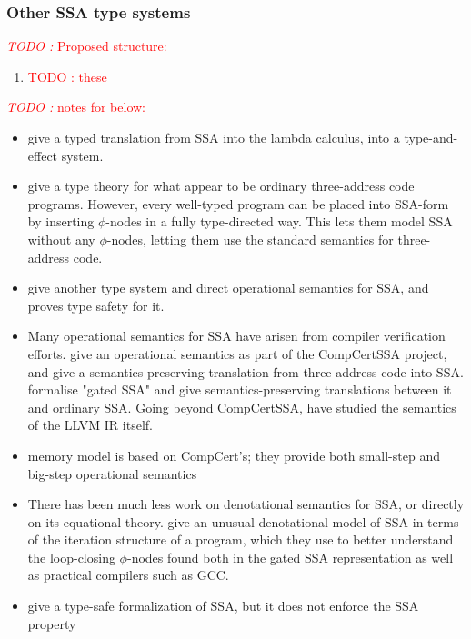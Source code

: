 \documentclass[acmsmall,screen,review]{acmart}
\newcounter{todos}
\newcommand{\TODO}[1]{{
  \stepcounter{todos}
  \begin{center}\large{\textcolor{red}{\emph{TODO \arabic{todos}:} #1}}\end{center}
}}
\newcommand{\todo}[1]{\stepcounter{todos} \textcolor{red}{TODO \arabic{todos}: #1}}
\begin{document}
\subsubsection{Other SSA type systems}

\TODO{Proposed structure:}

\begin{enumerate}
  \item \todo{these}
\end{enumerate}

\TODO{notes for below:}

\begin{itemize}
  \item \citet{typed-effect-ssa-rigon-torrens-vasconcellos-20} give a typed translation from SSA
  into the lambda calculus, into a type-and-effect system.
  \item \citet{ssa-types-matsuno-ohori-06} give a type theory for what appear to be ordinary
  three-address code programs. However, every well-typed program can be placed into SSA-form by
  inserting $\phi$-nodes in a fully type-directed way. This lets them model SSA without any
  $\phi$-nodes, letting them use the standard semantics for three-address code.
  \item \citet{hua-explicit-ssa-2010} give another type system and direct operational
  semantics for SSA, and proves type safety for it. 
  \item Many operational semantics for SSA have arisen from compiler verification efforts.
  \citet{barthe-compcert-ssa-2014} give an operational semantics as part of the CompCertSSA project,
  and give a semantics-preserving translation from three-address code into SSA.
  \citet{herklotz-gsa-2023} formalise "gated SSA" and give semantics-preserving translations between
  it and ordinary SSA. Going beyond CompCertSSA, \citet{vellvm-12} have studied the semantics of the
  LLVM IR itself.  
  \item \citet{vellvm-12} memory model is based on CompCert's; they provide both small-step and
  big-step operational semantics
  \item There has been much less work on denotational semantics for SSA, or directly on its
  equational theory. \citet{pop-ssa-inout-2009} give an unusual denotational model of SSA in terms
  of the iteration structure of a program, which they use to better understand the loop-closing
  $\phi$-nodes found both in the gated SSA representation as well as practical compilers such as
  GCC.
  \item \citet{menon-verified-06} give a type-safe formalization of SSA, but it does not enforce
  the SSA property
\end{itemize}
\end{document}
